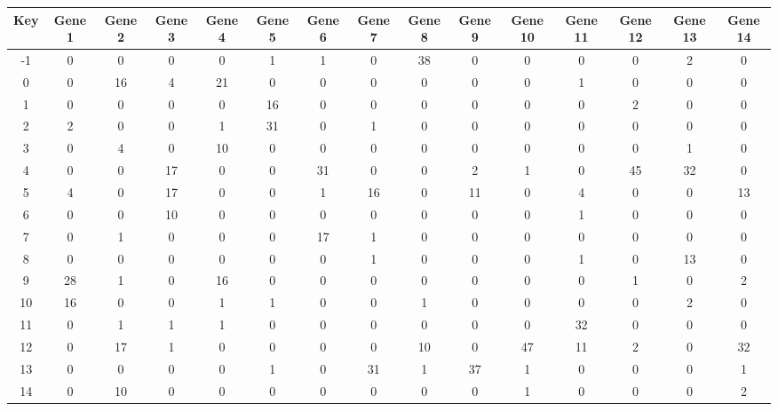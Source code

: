 \begin{tabular}{|c|c|c|c|c|c|c|c|c|c|c|c|c|c|c|}
\hline
Key & Gene 1 & Gene 2 & Gene 3 & Gene 4 & Gene 5 & Gene 6 & Gene 7 & Gene 8 & Gene 9 & Gene 10 & Gene 11 & Gene 12 & Gene 13 & Gene 14 \\
\hline
-1 & 0 & 0 & 0 & 0 & 1 & 1 & 0 & 38 & 0 & 0 & 0 & 0 & 2 & 0 \\
0 & 0 & 16 & 4 & 21 & 0 & 0 & 0 & 0 & 0 & 0 & 1 & 0 & 0 & 0 \\
1 & 0 & 0 & 0 & 0 & 16 & 0 & 0 & 0 & 0 & 0 & 0 & 2 & 0 & 0 \\
2 & 2 & 0 & 0 & 1 & 31 & 0 & 1 & 0 & 0 & 0 & 0 & 0 & 0 & 0 \\
3 & 0 & 4 & 0 & 10 & 0 & 0 & 0 & 0 & 0 & 0 & 0 & 0 & 1 & 0 \\
4 & 0 & 0 & 17 & 0 & 0 & 31 & 0 & 0 & 2 & 1 & 0 & 45 & 32 & 0 \\
5 & 4 & 0 & 17 & 0 & 0 & 1 & 16 & 0 & 11 & 0 & 4 & 0 & 0 & 13 \\
6 & 0 & 0 & 10 & 0 & 0 & 0 & 0 & 0 & 0 & 0 & 1 & 0 & 0 & 0 \\
7 & 0 & 1 & 0 & 0 & 0 & 17 & 1 & 0 & 0 & 0 & 0 & 0 & 0 & 0 \\
8 & 0 & 0 & 0 & 0 & 0 & 0 & 1 & 0 & 0 & 0 & 1 & 0 & 13 & 0 \\
9 & 28 & 1 & 0 & 16 & 0 & 0 & 0 & 0 & 0 & 0 & 0 & 1 & 0 & 2 \\
10 & 16 & 0 & 0 & 1 & 1 & 0 & 0 & 1 & 0 & 0 & 0 & 0 & 2 & 0 \\
11 & 0 & 1 & 1 & 1 & 0 & 0 & 0 & 0 & 0 & 0 & 32 & 0 & 0 & 0 \\
12 & 0 & 17 & 1 & 0 & 0 & 0 & 0 & 10 & 0 & 47 & 11 & 2 & 0 & 32 \\
13 & 0 & 0 & 0 & 0 & 1 & 0 & 31 & 1 & 37 & 1 & 0 & 0 & 0 & 1 \\
14 & 0 & 10 & 0 & 0 & 0 & 0 & 0 & 0 & 0 & 1 & 0 & 0 & 0 & 2 \\
\hline
\end{tabular}
